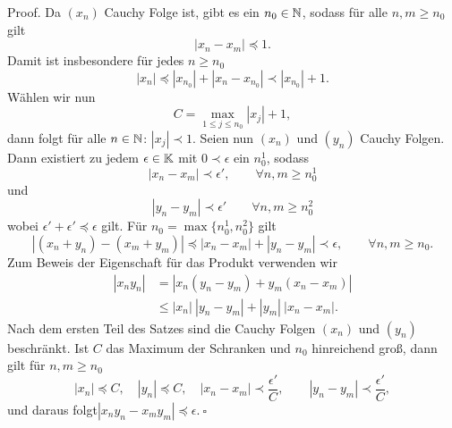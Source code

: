 \begin{emphBox}{}{}
Proof.  Da \((x_n)\) Cauchy Folge ist, gibt es ein \(n_0 \in \mathbb{N}\), sodass für alle \(n,m \geq n_0\) gilt
\begin{equation*}
 | x_n - x_m | \preceq 1.
\end{equation*}
Damit ist insbesondere für jedes \(n \geq n_0\)
\begin{equation*}
|x_n| \preceq |x_{n_0}| + |x_n - x_{n_0}| \prec |x_{n_0}| +1.
\end{equation*}
Wählen wir nun
\begin{equation*}
C = \max_{1 \leq j \leq n_0} |x_j| + 1,
\end{equation*}
dann folgt für alle \(n \in \mathbb{N}\): \(|x_j| \prec 1\).
Seien nun \((x_n)\) und \((y_n)\) Cauchy Folgen. Dann existiert zu jedem \(\epsilon \in \mathbb{K}\) mit \(0 \prec \epsilon\) ein \(n_0^1\), sodass
\begin{equation*}
|x_n - x_m| \prec \epsilon', \qquad \forall n,m \geq n_0^1
\end{equation*}
und
\begin{equation*}
|y_n - y_m| \prec \epsilon' \qquad \forall n,m \geq n_0^2
\end{equation*}
wobei \(\epsilon'+\epsilon' \preceq \epsilon\)
gilt. Für \(n_0 = \max\{n_0^1,n_0^2\}\) gilt
\begin{equation*}
|(x_n+y_n) - (x_m+y_m)| \preceq |x_n - x_m| + |y_n - y_m| \prec {\epsilon} , \qquad \forall n,m \geq n_0.
\end{equation*}
Zum Beweis der Eigenschaft für das Produkt verwenden wir
\begin{align*}
|x_n y_n| &= | x_n(y_n -y_m) + y_m (x_n - x_m) | \\&\leq |x_n| ~|y_n - y_m| + |y_m|~|x_n - x_m|.\end{align*}
Nach dem ersten Teil des Satzes sind die Cauchy Folgen \((x_n)\) und \((y_n)\) beschränkt. Ist \(C\) das Maximum der Schranken und \(n_0\) hinreichend groß, dann gilt für \(n,m \geq n_0\)
\begin{equation*}
|x_n| \preceq C, \quad |y_n| \preceq C, \quad |x_n - x_m| \prec \frac{\epsilon'}{C}, \qquad|y_n - y_m| \prec \frac{\epsilon'}{C},
\end{equation*}
und daraus folgt\( |x_n y_n - x_m y_m | \preceq \epsilon.~\square \)
\end{emphBox}


